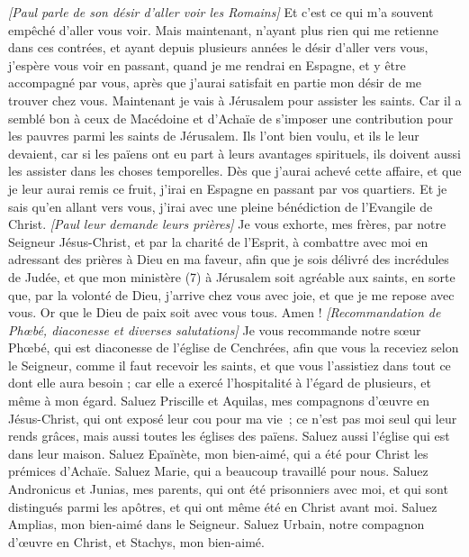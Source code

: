 \begin{multicols}{2}
\textit{[Paul parle de son désir d'aller voir les Romains]}
Et c’est ce qui m'a souvent empêché d’aller vous voir.
Mais maintenant, n’ayant plus rien qui me retienne dans ces contrées, et ayant depuis plusieurs années le désir d’aller vers vous,
j’espère vous voir en passant, quand je me rendrai en Espagne, et y être accompagné par vous, après que j’aurai satisfait en partie mon désir de me trouver chez vous.
Maintenant je vais à Jérusalem pour assister les saints.
Car il a semblé bon à ceux de Macédoine et d’Achaïe de s’imposer une contribution pour les pauvres parmi les saints de Jérusalem.
Ils l’ont bien voulu, et ils le leur devaient, car si les païens ont eu part à leurs avantages spirituels, ils doivent aussi les assister dans les choses temporelles.
Dès que j'aurai achevé cette affaire, et que je leur aurai remis ce fruit, j'irai en Espagne en passant par vos quartiers.
Et je sais qu’en allant vers vous, j’irai avec une pleine bénédiction de l'Evangile de Christ.
\textit{[Paul leur demande leurs prières]}
Je vous exhorte, mes frères, par notre Seigneur Jésus-Christ, et par la charité de l'Esprit, à combattre avec moi en adressant des prières à Dieu en ma faveur,
afin que je sois délivré des incrédules de Judée, et que mon ministère (7) à Jérusalem soit agréable aux saints,
en sorte que, par la volonté de Dieu, j’arrive chez vous avec joie, et que je me repose avec vous.
Or que le Dieu de paix soit avec vous tous. Amen !
\textit{[Recommandation de Phœbé, diaconesse et diverses salutations]}
\VerseOne{}Je vous recommande notre sœur Phœbé, qui est diaconesse de l'église de Cenchrées,
afin que vous la receviez selon le Seigneur, comme il faut recevoir les saints, et que vous l'assistiez dans tout ce dont elle aura besoin ; car elle a exercé l'hospitalité à l'égard de plusieurs, et même à mon égard.
Saluez Priscille et Aquilas, mes compagnons d’œuvre en Jésus-Christ,
qui ont exposé leur cou pour ma vie ; ce n’est pas moi seul qui leur rends grâces, mais aussi toutes les églises des païens.
Saluez aussi l'église qui est dans leur maison. Saluez Epaïnète, mon bien-aimé, qui a été pour Christ les prémices d'Achaïe.
Saluez Marie, qui a beaucoup travaillé pour nous.
Saluez Andronicus et Junias, mes parents, qui ont été prisonniers avec moi, et qui sont distingués parmi les apôtres, et qui ont même été en Christ avant moi.
Saluez Amplias, mon bien-aimé dans le Seigneur.
Saluez Urbain, notre compagnon d’œuvre en Christ, et Stachys, mon bien-aimé.

\end{multicols}
